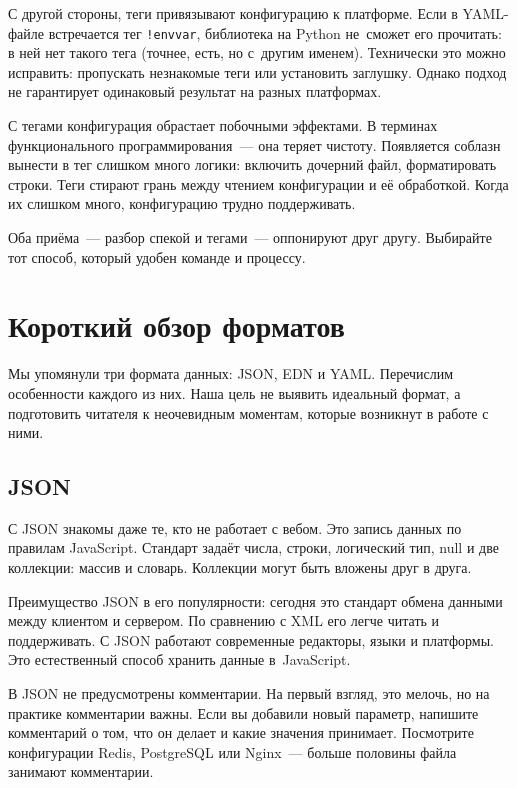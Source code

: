 С другой стороны, теги привязывают конфигурацию к платформе. Если в YAML-файле
встречается тег \verb|!envvar|, библиотека на Python не~сможет его прочитать: в
ней нет такого тега (точнее, есть, но с~другим именем). Технически это можно
исправить: пропускать незнакомые теги или установить заглушку. Однако подход не
гарантирует одинаковый результат на разных платформах.

С тегами конфигурация обрастает побочными эффектами. В терминах функционального
программирования~--- она теряет чистоту. Появляется соблазн вынести в тег слишком
много логики: включить дочерний файл, форматировать строки. Теги стирают грань
между чтением конфигурации и её обработкой. Когда их слишком много, конфигурацию
трудно поддерживать.

Оба приёма~--- разбор спекой и тегами~--- оппонируют друг другу. Выбирайте тот
способ, который удобен команде и процессу.

\section{Короткий обзор форматов}

Мы упомянули три формата данных: JSON, EDN и YAML. Перечислим особенности
каждого из них. Наша цель не выявить идеальный формат, а подготовить читателя к
неочевидным моментам, которые возникнут в работе с ними.

\subsection{JSON}


С JSON знакомы даже те, кто не работает с вебом. Это запись данных по правилам
JavaScript. Стандарт задаёт числа, строки, логический тип, null и две коллекции:
массив и словарь. Коллекции могут быть вложены друг в друга.


Преимущество JSON в его популярности: сегодня это стандарт обмена данными между
клиентом и сервером. По сравнению с XML его легче читать и поддерживать. С JSON
работают современные редакторы, языки и платформы. Это естественный способ
хранить данные в~JavaScript.

В JSON не предусмотрены комментарии. На первый взгляд, это мелочь, но на практике
комментарии важны. Если вы добавили новый параметр, напишите комментарий о том,
что он делает и какие значения принимает. Посмотрите конфигурации Redis,
PostgreSQL или Nginx~--- больше половины файла занимают комментарии.

